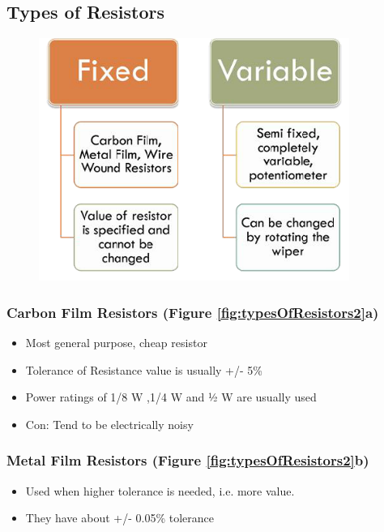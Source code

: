	\subsection{Types of Resistors}
		\begin{figure}[h]
			\centering
			\includegraphics{img/exp1/fig1}
			\caption[Types of Resistor]{}
			\label{fig:typesOfResistors}
		\end{figure}

		\subsubsection{Carbon Film Resistors (Figure \ref{fig:typesOfResistors2}a)}
			\begin{itemize}
				\tightlist
				\item Most general purpose, cheap resistor
				\item Tolerance of Resistance value is usually +/- 5\%
				\item Power ratings of 1/8 W ,1/4 W and ½ W are usually used
				\item Con: Tend to be electrically noisy
			\end{itemize}
		\subsubsection{Metal Film Resistors (Figure \ref{fig:typesOfResistors2}b)}
			\begin{itemize}
				\tightlist
				\item Used when higher tolerance is needed, i.e. more value.
				\item They have about +/- 0.05\% tolerance
			\end{itemize}

